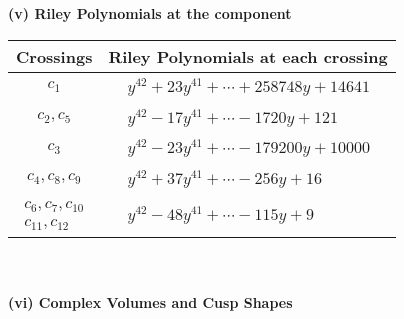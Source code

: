 \documentclass[1p]{elsarticle_modified}
\theoremstyle{definition}
\begin{document}
\newpage\renewcommand{\arraystretch}{1}
\flushleft \textbf{(v) Riley Polynomials at the component}\newline \\
\begin{tabular}{m{50pt}|m{274pt}}
Crossings & \hspace{64pt}Riley Polynomials at each crossing \\
\hline $$\begin{aligned}c_{1}\end{aligned}$$&$\begin{aligned}
&y^{42}+23 y^{41}+\cdots+258748 y+14641
\end{aligned}$\\
\hline $$\begin{aligned}c_{2},c_{5}\end{aligned}$$&$\begin{aligned}
&y^{42}-17 y^{41}+\cdots-1720 y+121
\end{aligned}$\\
\hline $$\begin{aligned}c_{3}\end{aligned}$$&$\begin{aligned}
&y^{42}-23 y^{41}+\cdots-179200 y+10000
\end{aligned}$\\
\hline $$\begin{aligned}c_{4},c_{8},c_{9}\end{aligned}$$&$\begin{aligned}
&y^{42}+37 y^{41}+\cdots-256 y+16
\end{aligned}$\\
\hline $$\begin{aligned}c_{6},c_{7},c_{10}\\c_{11},c_{12}\end{aligned}$$&$\begin{aligned}
&y^{42}-48 y^{41}+\cdots-115 y+9
\end{aligned}$\\
\hline
\end{tabular}\\~\\
\newpage\flushleft \textbf{(vi) Complex Volumes and Cusp Shapes}
\end{document}
